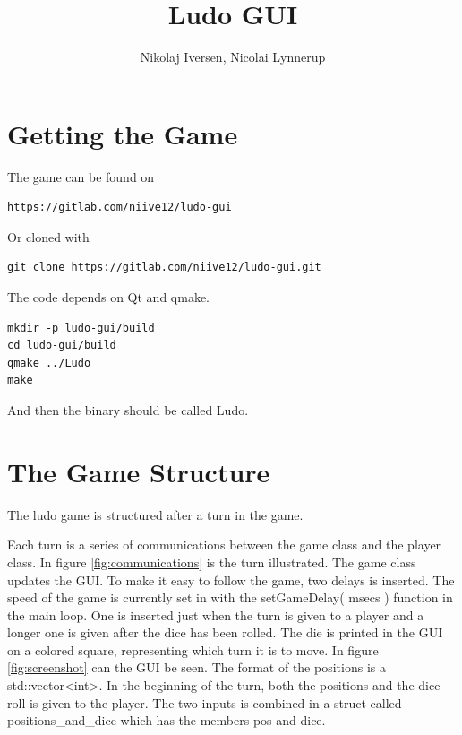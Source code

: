 \documentclass[a4paper,10pt]{article}
\title{Ludo GUI}
\author{Nikolaj Iversen, Nicolai Lynnerup}
\begin{document}
\maketitle

\section{Getting the Game}
The game can be found on
\begin{verbatim}
https://gitlab.com/niive12/ludo-gui
\end{verbatim}
Or cloned with
\begin{verbatim}
git clone https://gitlab.com/niive12/ludo-gui.git
\end{verbatim}
The code depends on Qt and qmake.
\begin{verbatim}
mkdir -p ludo-gui/build
cd ludo-gui/build
qmake ../Ludo
make
\end{verbatim}
And then the binary should be called Ludo.

\section{The Game Structure}
The ludo game is structured after a turn in the game.

Each turn is a series of communications between the game class and the player class.
In figure \ref{fig:communications} is the turn illustrated.
The game class updates the GUI.
To make it easy to follow the game, two delays is inserted.
The speed of the game is currently set in with the setGameDelay( msecs ) function in the main loop.
One is inserted just when the turn is given to a player and a longer one is given after the dice has been rolled.
The die is printed in the GUI on a colored square, representing which turn it is to move.
In figure \ref{fig:screenshot} can the GUI be seen.
The format of the positions is a std::vector<int>.
In the beginning of the turn, both the positions and the dice roll is given to the player.
The two inputs is combined in a struct called positions\_and\_dice which has the members pos and dice.
\end{document}
